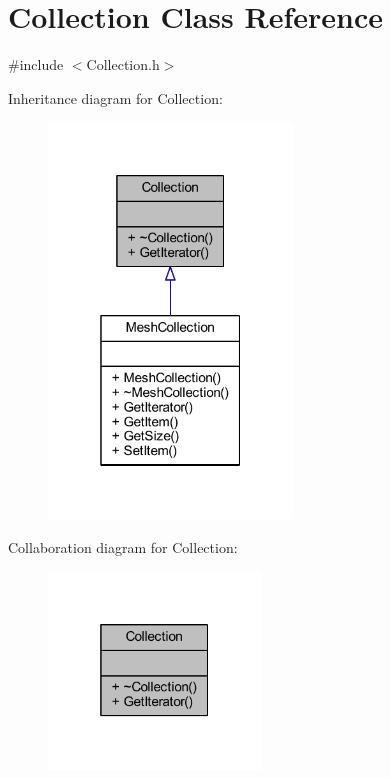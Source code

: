 \hypertarget{class_collection}{}\section{Collection Class Reference}
\label{class_collection}


{\ttfamily \#include $<$Collection.\+h$>$}



Inheritance diagram for Collection\+:\nopagebreak
\begin{figure}[H]
\begin{center}
\leavevmode
\includegraphics[width=184pt]{class_collection__inherit__graph}
\end{center}
\end{figure}


Collaboration diagram for Collection\+:\nopagebreak
\begin{figure}[H]
\begin{center}
\leavevmode
\includegraphics[width=160pt]{class_collection__coll__graph}
\end{center}
\end{figure}

